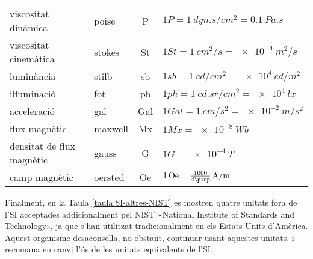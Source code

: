 \begin{ThreePartTable}
\begin{longtable}[h]{llcl}
    viscositat dinàmica & poise & \si{P} & $1\unit{P} = \SI{1}{dyn.s/cm^2} = \SI{0,1}{Pa.s}$ \\
    viscositat cinemàtica & stokes & \si{St} & $1\unit{St} = \SI{1}{cm^2/s} = \SI{e-4}{m^2/s}$ \\
    luminància & stilb & \si{sb} & $1\unit{sb} = \SI{1}{cd/cm^2} = \SI{e4}{cd/m^2}$ \\
    iŀluminació & fot & \si{ph} & $1\unit{ph} = \SI{1}{cd.sr/cm^2} = \SI{e4}{lx}$ \\
    acceleració & gal & \si{Gal} & $1\unit{Gal} = \SI{1}{cm/s^2} = \SI{e-2}{m/s^2}$ \\
    flux magnètic & maxwell & \si{Mx} & $1\unit{Mx} = \SI{e-8}{Wb}$ \\
    densitat de flux magnètic & gauss & \si{G} & $1\unit{G} = \SI{e-4}{T}$ \\
    camp magnètic & oersted & \si{Oe} & $1\unit{Oe} = \frac{1000}{4\piup}\unit{A/m}$ \\
\bottomrule[1pt]
\end{longtable}
\end{ThreePartTable}


Finalment, en la Taula \vref{taula:SI-altres-NIST} es mostren quatre unitats fora de l'SI acceptades addicionalment pel NIST «National Institute of Standards and Technology», ja que s'han utilitzat tradicionalment en els Estats Units d'Amèrica. Aquest organisme desaconsella, no obstant, continuar usant aquestes unitats, i recomana en canvi l'ús de les unitats equivalents de l'SI.

